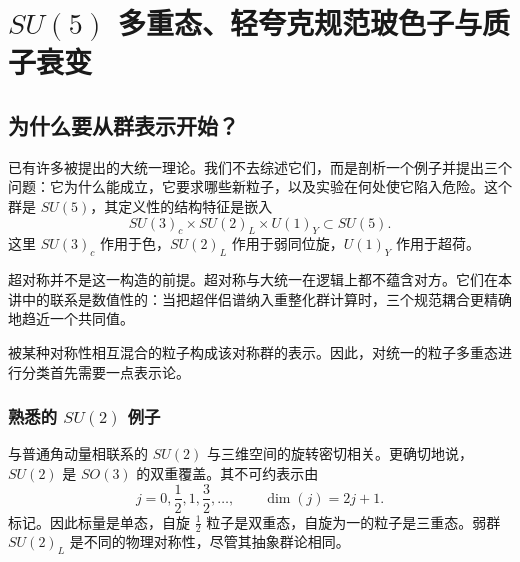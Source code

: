 \chapter{\texorpdfstring{\(SU(5)\)}{SU(5)} 多重态、轻夸克规范玻色子与质子衰变}


\section{为什么要从群表示开始？}

已有许多被提出的大统一理论。我们不去综述它们，而是剖析一个例子并提出三个问题：它为什么能成立，它要求哪些新粒子，以及实验在何处使它陷入危险。这个群是 \(SU(5)\)，其定义性的结构特征是嵌入
\begin{equation}
SU(3)_c\times SU(2)_L\times U(1)_Y
\subset SU(5).
\label{eq:l10-sm-embedding}
\end{equation}
这里 \(SU(3)_c\) 作用于色，\(SU(2)_L\) 作用于弱同位旋，\(U(1)_Y\) 作用于超荷。

超对称并不是这一构造的前提。超对称与大统一在逻辑上都不蕴含对方。它们在本讲中的联系是数值性的：当把超伴侣谱纳入重整化群计算时，三个规范耦合更精确地趋近一个共同值。

被某种对称性相互混合的粒子构成该对称群的表示。因此，对统一的粒子多重态进行分类首先需要一点表示论。

\subsection{熟悉的 \texorpdfstring{\(SU(2)\)}{SU(2)} 例子}

与普通角动量相联系的 \(SU(2)\) 与三维空间的旋转密切相关。更确切地说，\(SU(2)\) 是 \(SO(3)\) 的双重覆盖。其不可约表示由
\begin{equation}
j=0,\frac12,1,\frac32,\ldots,
\qquad
\dim(j)=2j+1.
\label{eq:l10-su2-spins}
\end{equation}
标记。因此标量是单态，自旋 \(\tfrac12\) 粒子是双重态，自旋为一的粒子是三重态。弱群 \(SU(2)_L\) 是不同的物理对称性，尽管其抽象群论相同。

